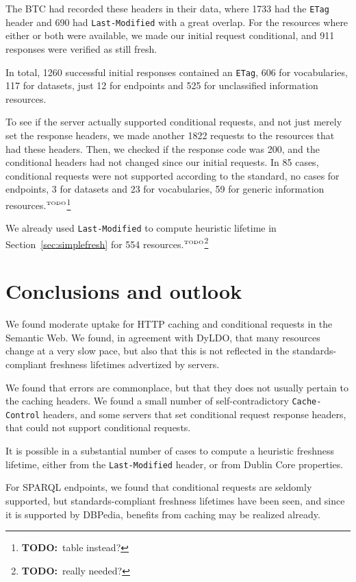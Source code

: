 \documentclass{llncs}
\newcommand{\httph}[1]{\texttt{#1}}
\newcommand{\todo}[1]{\ensuremath{^{\textrm{\tiny{TODO}\normalsize}}}\footnote{\textbf{TODO:}~#1}}
\begin{document}
The BTC had recorded these headers in their data, where 1733 had the
\httph{ETag} header and 690 had \httph{Last-Modified} with a great
overlap. For the resources where either or both were available, we
made our initial request conditional, and 911 responses were verified
as still fresh. 

In total, 1260 successful initial responses contained
an \httph{ETag}, 606 for vocabularies, 117 for datasets, just 12 for
endpoints and 525 for unclassified information resources.

To see if the server actually supported conditional requests, and not
just merely set the response headers, we made another 1822 requests to
the resources that had these headers. Then, we checked if the response
code was 200, and the conditional headers had not changed since our
initial requests. In 85 cases, conditional requests were not supported
according to the standard, no cases for endpoints, 3 for datasets and
23 for vocabularies, 59 for generic information resources.\todo{table instead?}


We already used \httph{Last-Modified} to compute heuristic lifetime
in Section~\ref{sec:simplefresh} for 554 resources.\todo{really needed?}

\section{Conclusions and outlook}

We found moderate uptake for HTTP caching and conditional requests in
the Semantic Web. We found, in agreement with DyLDO\cite{dyldo2}, that
many resources change at a very slow pace, but also that this is not
reflected in the standards-compliant freshness lifetimes advertized by
servers.

We found that errors are commonplace, but that they does not usually
pertain to the caching headers. We found a small number of
self-contradictory \httph{Cache-Control} headers, and some servers
that set conditional request response headers, that could not support
conditional requests.

It is possible in a substantial number of cases to compute a heuristic
freshness lifetime, either from the \httph{Last-Modified} header, or
from Dublin Core properties. 

For SPARQL endpoints, we found that conditional requests are 
seldomly supported, but standards-compliant freshness lifetimes have
been seen, and since it is supported by DBPedia, benefits from caching
may be realized already.
\end{document}
